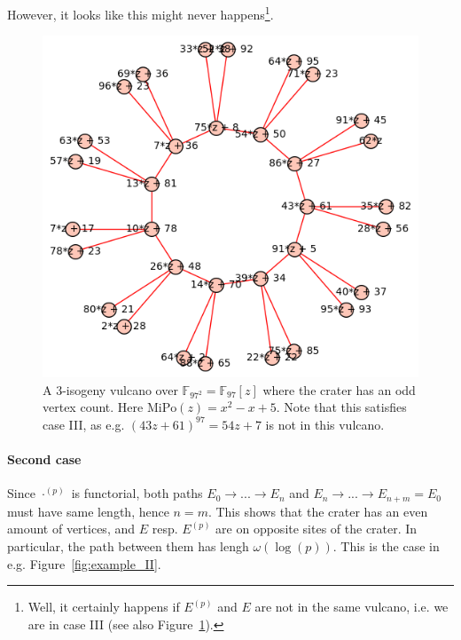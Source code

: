 \documentclass{scrartcl}
\newcommand{\F}{\mathbb{F}}
\theoremstyle{definition}
\begin{document}
However, it looks like this might never happens\footnote{Well, it certainly happens if $E^{(p)}$ and $E$ are not in the same vulcano, i.e. we are in case III (see also Figure~\ref{fig:example_odd_crater}).}.
\begin{figure}
    \includegraphics{./example_odd_crater.png}
    \caption{\label{fig:example_odd_crater} A 3-isogeny vulcano over $\F_{97^2} = \F_{97}[z]$ where the crater has an odd vertex count. Here $\mathrm{MiPo}(z) = x^2 - x + 5$. Note that this satisfies case III, as e.g. $(43z + 61)^{97} = 54z + 7$ is not in this vulcano.}
\end{figure}

\paragraph*{Second case} Since $\cdot^{(p)}$ is functorial, both paths $E_0 \to ... \to E_n$ and $E_n \to ... \to E_{n + m} = E_0$ must have same length, hence $n = m$.
This shows that the crater has an even amount of vertices, and $E$ resp. $E^{(p)}$ are on opposite sites of the crater.
In particular, the path between them has lengh $\omega(\log(p))$.
This is the case in e.g. Figure~\ref{fig:example_II}.
\end{document}
